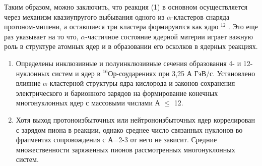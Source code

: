 \documentclass[fontsize=14pt]{scrreport}
\begin{document}
Таким образом, можно заключить, что реакция (1) в основном осуществляется через механизм квазиупругого выбывания одного из $\alpha$-кластеров снаряда протоном-мишени, а оставшиеся три кластера формируются как ядро $^{12}$ . Это еще раз указывает на то что, $\alpha$-частичное состояние ядерной материи играет важную роль в структуре атомных ядер и в образовании его осколков в ядерных реакциях.

\begin{enumerate}
    \item Определены инклюзивные и полуинклюзивные сечения образования 4- и 12-нуклонных систем и ядер в $^{16}$Ор-соударениях при 3,25 А ГэВ/с. Установлено влияние $\alpha$-кластерной структуры ядра кислорода и законов сохранения электрического и барионного зарядов на формирование конечных многонуклонных ядер с массовыми числами А $\le$ 12.
    \item Хотя выход протоноизбыточных или нейтроноизбыточных ядер коррелирован с зарядом пиона в реакции, однако среднее число связанных нуклонов во фрагментах сопровождения с А=2-3 от него не зависит. Средние множественности заряженных пионов рассмотренных многонуклонных систем.
    \end{enumerate}
    
\end{document}
